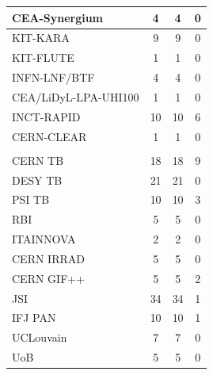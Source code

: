 \begin{xltabular}{\textwidth}{|X|c|c|c|}
    CEA-Synergium & 4 & 4 & 0 \\ \hline
    KIT-KARA & 9 & 9 & 0 \\ \hline
    KIT-FLUTE & 1 & 1 & 0 \\ \hline
    INFN-LNF/BTF & 4 & 4 & 0 \\ \hline
    CEA/LiDyL-LPA-UHI100 & 1 & 1 & 0 \\ \hline
    INCT-RAPID & 10 & 10 & 6 \\ \hline
    CERN-CLEAR & 1 & 1 & 0 \\ \hline
      \\ \hline
  CERN TB &	18	& 18 &  9\\ \hline
DESY TB	&21	&21&  0\\ \hline
PSI TB	&10	&10& 3 \\ \hline
RBI	&5	&5&  0\\ \hline
ITAINNOVA&	2&	2&  0\\ \hline
CERN IRRAD	&5&	5&  0\\ \hline
CERN GIF++	&5&	5& 2 \\ \hline
JSI	&34&	34&  1\\ \hline
IFJ PAN	&10&	10& 1 \\ \hline
UCLouvain	&7&	7&  0\\ \hline
UoB	&5&	5  &  0\\ \hline
\end{xltabular}


